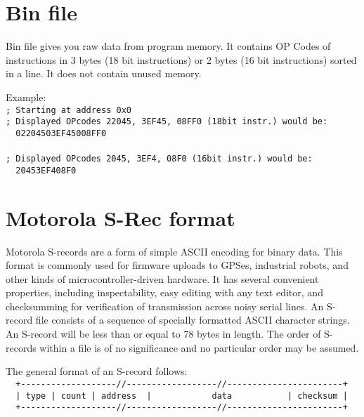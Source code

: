 \section{Bin file}
    Bin file gives you raw data from program memory. It contains OP Codes of instructions in 3 bytes (18 bit instructions) or 2 bytes (16 bit instructions) sorted in a line. It does not contain unused memory.

    Example:\\
    {
        \usecodefont
        \verb'; Starting at address 0x0'\\
        \verb'; Displayed OPcodes 22045, 3EF45, 08FF0 (18bit instr.) would be:'\\
        \verb'  02204503EF45008FF0 '\\\\
        \verb'; Displayed OPcodes 2045, 3EF4, 08F0 (16bit instr.) would be:'\\
        \verb'  20453EF408F0 '\\
    }

\clearpage
\section{Motorola S-Rec format}
    Motorola S-records are a form of simple ASCII encoding for binary data. This format is commonly used for firmware uploads to GPSes, industrial robots, and other kinds of microcontroller-driven hardware. It has several convenient properties, including inspectability, easy editing with any text editor, and checksumming for verification of transmission across noisy serial lines. An S-record file consists of a sequence of specially formatted ASCII character strings. An S-record will be less than or equal to 78 bytes in length. The order of S-records within a file is of no significance and no particular order may be assumed.

    The general format of an S-record follows:\\
    {
        \usecodefont
        \verb'  +-------------------//------------------//-----------------------+'\\
        \verb'  | type | count | address  |            data           | checksum |'\\
        \verb'  +-------------------//------------------//-----------------------+'\\
    }

